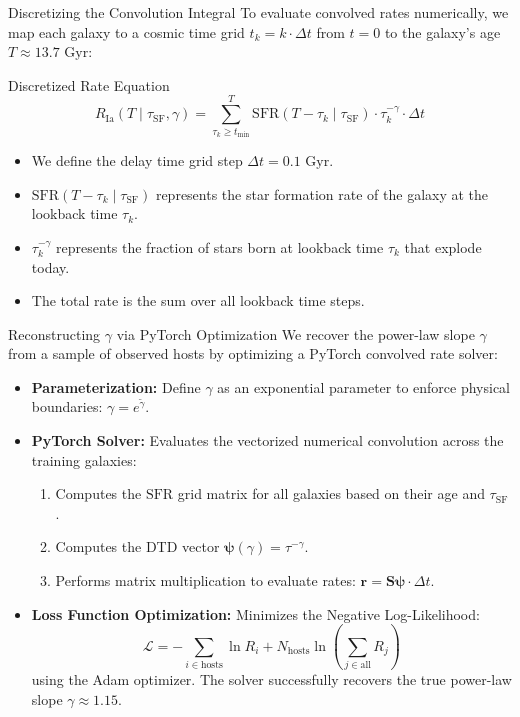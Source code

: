 \documentclass[9pt]{beamer}
\begin{document}
\begin{frame}{Discretizing the Convolution Integral}
  To evaluate convolved rates numerically, we map each galaxy to a cosmic time grid $t_k = k \cdot \Delta t$ from $t=0$ to the galaxy's age $T \approx 13.7\text{ Gyr}$:
  \begin{block}{Discretized Rate Equation}
    $$R_{\text{Ia}}(T \mid \tau_{\text{SF}}, \gamma) = \sum_{\tau_k \ge t_{\text{min}}}^{T} \text{SFR}(T - \tau_k \mid \tau_{\text{SF}}) \cdot \tau_k^{-\gamma} \cdot \Delta t$$
  \end{block}
  \begin{itemize}
    \item We define the delay time grid step $\Delta t = 0.1\text{ Gyr}$.
    \item $\text{SFR}(T - \tau_k \mid \tau_{\text{SF}})$ represents the star formation rate of the galaxy at the lookback time $\tau_k$.
    \item $\tau_k^{-\gamma}$ represents the fraction of stars born at lookback time $\tau_k$ that explode today.
    \item The total rate is the sum over all lookback time steps.
  \end{itemize}
\end{frame}

\begin{frame}{Reconstructing $\gamma$ via PyTorch Optimization}
  We recover the power-law slope $\gamma$ from a sample of observed hosts by optimizing a PyTorch convolved rate solver:
  \begin{itemize}
    \item \textbf{Parameterization:} Define $\gamma$ as an exponential parameter to enforce physical boundaries: $\gamma = e^{\tilde{\gamma}}$.
    \item \textbf{PyTorch Solver:} Evaluates the vectorized numerical convolution across the training galaxies:
      \begin{enumerate}
        \item Computes the $\text{SFR}$ grid matrix for all galaxies based on their age and $\tau_{\text{SF}}$.
        \item Computes the DTD vector $\boldsymbol{\psi}(\gamma) = \tau^{-\gamma}$.
        \item Performs matrix multiplication to evaluate rates: $\mathbf{r} = \mathbf{S} \boldsymbol{\psi} \cdot \Delta t$.
      \end{enumerate}
    \item \textbf{Loss Function Optimization:} Minimizes the Negative Log-Likelihood:
      $$\mathcal{L} = -\sum_{i \in \text{hosts}} \ln R_i + N_{\text{hosts}} \ln \left( \sum_{j \in \text{all}} R_j \right)$$
      using the Adam optimizer. The solver successfully recovers the true power-law slope $\gamma \approx 1.15$.
  \end{itemize}
\end{frame}
\end{document}
